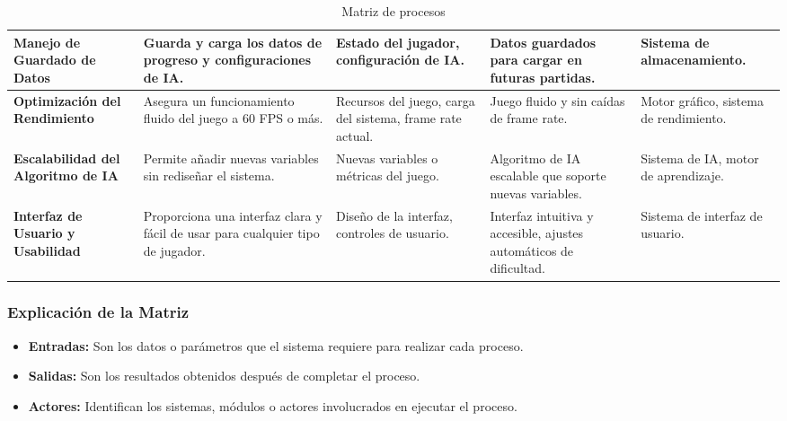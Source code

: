 \begin{table}[H]
\begin{adjustbox}{width=\textwidth}
\begin{tabular}{|p{4cm}|p{5cm}|p{4cm}|p{4cm}|p{4cm}|}
        \hline
        \textbf{Manejo de Guardado de Datos} & Guarda y carga los datos de progreso y configuraciones de IA. & Estado del jugador, configuración de IA. & Datos guardados para cargar en futuras partidas. & Sistema de almacenamiento. \\
        \hline
        \textbf{Optimización del Rendimiento} & Asegura un funcionamiento fluido del juego a 60 FPS o más. & Recursos del juego, carga del sistema, frame rate actual. & Juego fluido y sin caídas de frame rate. & Motor gráfico, sistema de rendimiento. \\
        \hline
        \textbf{Escalabilidad del Algoritmo de IA} & Permite añadir nuevas variables sin rediseñar el sistema. & Nuevas variables o métricas del juego. & Algoritmo de IA escalable que soporte nuevas variables. & Sistema de IA, motor de aprendizaje. \\
        \hline
        \textbf{Interfaz de Usuario y Usabilidad} & Proporciona una interfaz clara y fácil de usar para cualquier tipo de jugador. & Diseño de la interfaz, controles de usuario. & Interfaz intuitiva y accesible, ajustes automáticos de dificultad. & Sistema de interfaz de usuario. \\
        \hline
        \end{tabular}
    \end{adjustbox}
    \caption{Matriz de procesos}
    \label{tab:proyecto_procesos}
\end{table}

\subsubsection*{Explicación de la Matriz}
\begin{itemize}
    \item \textbf{Entradas:} Son los datos o parámetros que el sistema requiere para realizar cada proceso.
    \item \textbf{Salidas:} Son los resultados obtenidos después de completar el proceso.
    \item \textbf{Actores:} Identifican los sistemas, módulos o actores involucrados en ejecutar el proceso.
\end{itemize}